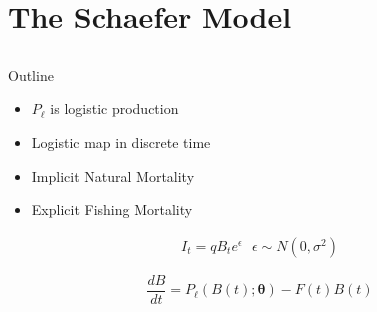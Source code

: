 \documentclass[ xcolor = pdftex, dvipsnames, table ]{beamer}
\begin{document}

%
\section{The Schaefer Model}
\subsection{}
\begin{frame}{Outline}
\end{frame}

%
\begin{frame}
	\begin{minipage}[h!]{0.59\textwidth}
	\begin{itemize}
	\setlength\itemsep{1em}
	\item $P_\ell$ is logistic production
	\item Logistic map in discrete time 
	\item Implicit Natural Mortality
	\item Explicit Fishing Mortality 
	\end{itemize}
	\end{minipage}
	\begin{minipage}[h!]{0.39\textwidth}
        \begin{align*}
        I_t = q B_t e^\epsilon ~~~ \epsilon\sim N(0, \sigma^2)
        \end{align*}

        \begin{equation*}
        \frac{dB}{dt} = P_\ell(B(t); \bm{\theta}) - F(t)B(t)
        \end{equation*}
	\end{minipage}
\end{frame}
\end{document}
